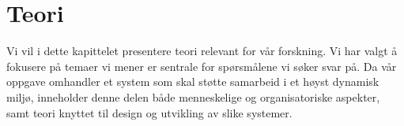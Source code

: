 \chapter{Teori}
\label{chp:teori}


Vi vil i dette kapittelet presentere teori relevant for vår forskning. Vi har valgt å fokusere på temaer vi mener er sentrale for spørsmålene vi søker svar på. Da vår oppgave omhandler et system som skal støtte samarbeid i et høyst dynamisk miljø, inneholder denne delen  både menneskelige og organisatoriske aspekter, samt teori knyttet til design og utvikling av slike systemer.
